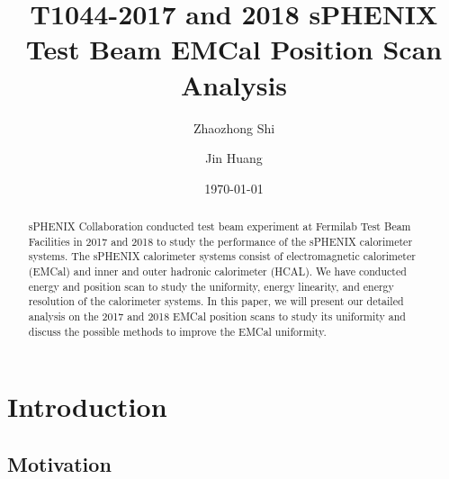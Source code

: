 \documentclass[hidelinks,11pt]{article}
\numberwithin{figure}{section}
\numberwithin{table}{section}
\begin{document}
\title{T1044-2017 and 2018 sPHENIX Test Beam EMCal Position Scan Analysis}
\author[1]{Zhaozhong Shi}
\author[2]{Jin Huang}

\date{\today}


    
\maketitle


\begin{abstract}
sPHENIX Collaboration conducted test beam experiment at Fermilab Test Beam Facilities in 2017 and 2018 to study the performance of the sPHENIX calorimeter systems. The sPHENIX calorimeter systems consist of electromagnetic calorimeter (EMCal) and inner and outer hadronic calorimeter (HCAL). We have conducted energy and position scan to study the uniformity, energy linearity, and energy resolution of the calorimeter systems. In this paper, we will present our detailed analysis on the 2017 and 2018 EMCal position scans to study its uniformity and discuss the possible methods to improve the EMCal uniformity.
\end{abstract}


\tableofcontents

\clearpage
\listoffigures
\clearpage


\setlength{\parskip}{1em}




\section{Introduction}

\subsection{Motivation}
\end{document}
